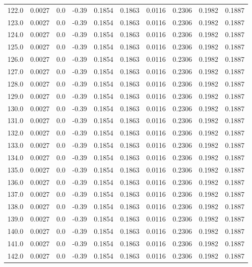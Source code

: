 \begin{longtable}{lrrrrrrrrr}
122.0 & 0.0027 & 0.0 & -0.39 & 0.1854 & 0.1863 & 0.0116 & 0.2306 & 0.1982 & 0.1887 \\
123.0 & 0.0027 & 0.0 & -0.39 & 0.1854 & 0.1863 & 0.0116 & 0.2306 & 0.1982 & 0.1887 \\
124.0 & 0.0027 & 0.0 & -0.39 & 0.1854 & 0.1863 & 0.0116 & 0.2306 & 0.1982 & 0.1887 \\
125.0 & 0.0027 & 0.0 & -0.39 & 0.1854 & 0.1863 & 0.0116 & 0.2306 & 0.1982 & 0.1887 \\
126.0 & 0.0027 & 0.0 & -0.39 & 0.1854 & 0.1863 & 0.0116 & 0.2306 & 0.1982 & 0.1887 \\
127.0 & 0.0027 & 0.0 & -0.39 & 0.1854 & 0.1863 & 0.0116 & 0.2306 & 0.1982 & 0.1887 \\
128.0 & 0.0027 & 0.0 & -0.39 & 0.1854 & 0.1863 & 0.0116 & 0.2306 & 0.1982 & 0.1887 \\
129.0 & 0.0027 & 0.0 & -0.39 & 0.1854 & 0.1863 & 0.0116 & 0.2306 & 0.1982 & 0.1887 \\
130.0 & 0.0027 & 0.0 & -0.39 & 0.1854 & 0.1863 & 0.0116 & 0.2306 & 0.1982 & 0.1887 \\
131.0 & 0.0027 & 0.0 & -0.39 & 0.1854 & 0.1863 & 0.0116 & 0.2306 & 0.1982 & 0.1887 \\
132.0 & 0.0027 & 0.0 & -0.39 & 0.1854 & 0.1863 & 0.0116 & 0.2306 & 0.1982 & 0.1887 \\
133.0 & 0.0027 & 0.0 & -0.39 & 0.1854 & 0.1863 & 0.0116 & 0.2306 & 0.1982 & 0.1887 \\
134.0 & 0.0027 & 0.0 & -0.39 & 0.1854 & 0.1863 & 0.0116 & 0.2306 & 0.1982 & 0.1887 \\
135.0 & 0.0027 & 0.0 & -0.39 & 0.1854 & 0.1863 & 0.0116 & 0.2306 & 0.1982 & 0.1887 \\
136.0 & 0.0027 & 0.0 & -0.39 & 0.1854 & 0.1863 & 0.0116 & 0.2306 & 0.1982 & 0.1887 \\
137.0 & 0.0027 & 0.0 & -0.39 & 0.1854 & 0.1863 & 0.0116 & 0.2306 & 0.1982 & 0.1887 \\
138.0 & 0.0027 & 0.0 & -0.39 & 0.1854 & 0.1863 & 0.0116 & 0.2306 & 0.1982 & 0.1887 \\
139.0 & 0.0027 & 0.0 & -0.39 & 0.1854 & 0.1863 & 0.0116 & 0.2306 & 0.1982 & 0.1887 \\
140.0 & 0.0027 & 0.0 & -0.39 & 0.1854 & 0.1863 & 0.0116 & 0.2306 & 0.1982 & 0.1887 \\
141.0 & 0.0027 & 0.0 & -0.39 & 0.1854 & 0.1863 & 0.0116 & 0.2306 & 0.1982 & 0.1887 \\
142.0 & 0.0027 & 0.0 & -0.39 & 0.1854 & 0.1863 & 0.0116 & 0.2306 & 0.1982 & 0.1887 \\

\end{longtable}
